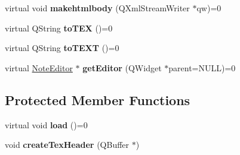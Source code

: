 \begin{DoxyCompactItemize}
\item 
\hypertarget{classNote_a5126f046068ca9d4762685c4f9b1b131}{virtual void {\bfseries makehtmlbody} (\-Q\-Xml\-Stream\-Writer $\ast$qw)=0}\label{classNote_a5126f046068ca9d4762685c4f9b1b131}

\item 
\hypertarget{classNote_ae677cec085c722e939736823d3b6c242}{virtual \-Q\-String {\bfseries to\-T\-E\-X} ()=0}\label{classNote_ae677cec085c722e939736823d3b6c242}

\item 
\hypertarget{classNote_a14650fab181136a122541b83d51b24f5}{virtual \-Q\-String {\bfseries to\-T\-E\-X\-T} ()=0}\label{classNote_a14650fab181136a122541b83d51b24f5}

\item 
\hypertarget{classNote_a2cdb1d951f9983306c3d937c1a4a76ac}{virtual \hyperlink{classNoteEditor}{\-Note\-Editor} $\ast$ {\bfseries get\-Editor} (\-Q\-Widget $\ast$parent=\-N\-U\-L\-L)=0}\label{classNote_a2cdb1d951f9983306c3d937c1a4a76ac}

\end{DoxyCompactItemize}
\subsection*{\-Protected \-Member \-Functions}
\begin{DoxyCompactItemize}
\item 
\hypertarget{classNote_afd8122ada6839ee48f0d92f5646186a0}{virtual void {\bfseries load} ()=0}\label{classNote_afd8122ada6839ee48f0d92f5646186a0}

\item 
\hypertarget{classNote_a3b20f80c2cf8511f0581e28d4927b6ee}{void {\bfseries create\-Tex\-Header} (\-Q\-Buffer $\ast$)}\label{classNote_a3b20f80c2cf8511f0581e28d4927b6ee}

\end{DoxyCompactItemize}
